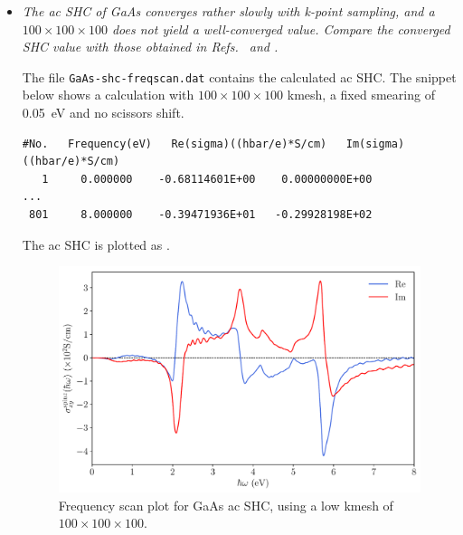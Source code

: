 \begin{itemize}
	\item {\it The ac SHC of GaAs converges rather slowly with k-point sampling, and a $100 \times 100 \times 100$ does not yield a well-converged value.
	Compare the converged SHC value with those obtained in Refs.~ and .}

	The file {\tt GaAs-shc-freqscan.dat} contains the calculated ac SHC. The snippet below shows a calculation with $100\times100\times100$ kmesh, a fixed smearing of 0.05~eV and no scissors shift.

\begin{tcolorbox}[title=$100\times100\times100$ kmesh,sharp corners,boxrule=0.5pt]
{\small
\begin{verbatim}
#No.   Frequency(eV)   Re(sigma)((hbar/e)*S/cm)   Im(sigma)((hbar/e)*S/cm)
   1     0.000000    -0.68114601E+00    0.00000000E+00
...
 801     8.000000    -0.39471936E+01   -0.29928198E+02
\end{verbatim}
}
\end{tcolorbox}

The ac SHC is plotted as .
\begin{figure}[htb!]
\centering
\includegraphics[width=.8\columnwidth]{figure/example30/gaas_freqscan_100kpt.pdf}
\caption{Frequency scan plot for GaAs ac SHC, using 
	a low kmesh of $100\times100\times100$.}
\label{fig30.1}
\end{figure}


\end{itemize}
